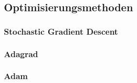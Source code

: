 \subsection{Optimisierungsmethoden}\label{Optimisierungsmethoden}

\subsubsection{Stochastic Gradient Descent}\label{Stochastic Gradient Descent}

\subsubsection{Adagrad}\label{Adagrad}

\subsubsection{Adam}\label{Adam}